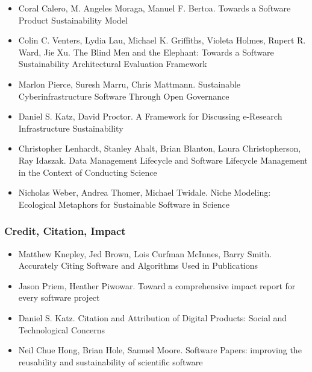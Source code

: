 \documentclass[11pt, oneside]{amsart}
\begin{document}
\begin{itemize}

\item Coral Calero, M. Angeles Moraga, Manuel F. Bertoa. Towards a
  Software Product Sustainability Model~\cite{Calero_WSSSPE}

\item Colin C. Venters, Lydia Lau, Michael K. Griffiths, Violeta
  Holmes, Rupert R. Ward, Jie Xu. The Blind Men and the Elephant:
  Towards a Software Sustainability Architectural Evaluation Framework~\cite{Venters_WSSSPE}

\item Marlon Pierce, Suresh Marru, Chris Mattmann. Sustainable
  Cyberinfrastructure Software Through Open Governance~\cite{Pierce_WSSSPE}

\item Daniel S. Katz, David Proctor. A Framework for Discussing
  e-Research Infrastructure Sustainability~\cite{Katz_WSSSPE}

\item Christopher Lenhardt, Stanley Ahalt, Brian Blanton, Laura
  Christopherson, Ray Idaszak. Data Management Lifecycle and Software
  Lifecycle Management in the Context of Conducting Science~\cite{Lenhardt_WSSSPE}

\item Nicholas Weber, Andrea Thomer, Michael Twidale. Niche Modeling:
  Ecological Metaphors for Sustainable Software in Science~\cite{Weber_WSSSPE}

\end{itemize}

\subsubsection*{Credit, Citation, Impact}

\begin{itemize}

\item Matthew Knepley, Jed Brown, Lois Curfman McInnes, Barry
  Smith. Accurately Citing Software and Algorithms Used in
  Publications~\cite{Knepley_WSSSPE}

\item Jason Priem, Heather Piwowar. Toward a comprehensive impact
  report for every software project~\cite{Priem_WSSSPE}

\item Daniel S. Katz. Citation and Attribution of Digital Products:
  Social and Technological Concerns~\cite{Katz2_WSSSPE}

\item Neil Chue Hong, Brian Hole, Samuel Moore. Software Papers:
  improving the reusability and sustainability of scientific software~\cite{Chue_Hong_WSSSPE}

\end{itemize}
\end{document}
